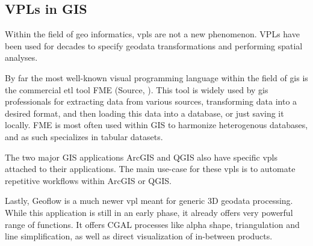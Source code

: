 \subsection*{ VPLs in GIS }

Within the field of geo informatics, \ac{vpl}s are not a new phenomenon. VPLs have been used for decades to specify geodata transformations and performing spatial analyses.  

By far the most well-known visual programming language within the field of \ac{gis} is the commercial \ac{etl} tool FME (Source, ). 
This tool is widely used by \ac{gis} professionals for extracting data from various sources, transforming data into a desired format, and then loading this data into a database, or just saving it locally.  
FME is most often used within GIS to harmonize heterogenous databases, and as such specializes in tabular datasets. 

The two major GIS applications ArcGIS and QGIS also have specific \ac{vpl}s attached to their applications. 
The main use-case for these \ac{vpl}s is to automate repetitive workflows within ArcGIS or QGIS. 

Lastly, Geoflow is a much newer \ac{vpl} meant for generic 3D geodata processing.
While this application is still in an early phase,  it already offers very powerful 
range of functions.
It offers CGAL processes like alpha shape, triangulation and line simplification, as well as direct visualization of in-between products.


